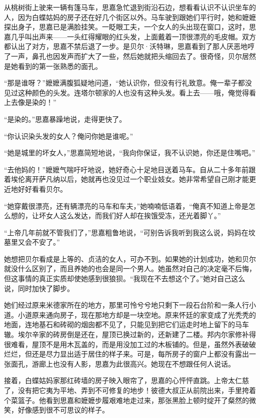\par 从桃树街上驶来一辆有篷马车，思嘉急忙退到街沿石边，想看看认识不认识坐车的人，因为白蝶姑妈的房子还在好几个街区以外。马车驶到跟她们平行时，她和嬷嬷探出身子，思嘉已是满脸挂笑。一眨眼工夫，一个女人的头出现在窗口，这时，思嘉几乎叫出声来——一头红得耀眼的红头发，上面戴着一顶很漂亮的毛皮帽。双方都认出了对方，思嘉不禁后退了一步。是贝尔·沃特琳，思嘉看到了那人厌恶地哼了一声，鼻孔也因发声而扩大了一些，然后她就把头缩回去了。很奇怪，贝尔居然是她看到的第一张熟悉的面孔。
\par “那是谁呀？”嬷嬷满腹狐疑地问道，“她认识你，但没有行礼致意。俺一辈子都没见过这种颜色的头发。连塔尔顿家的人也没有这种头发。看上去——哦，俺觉得看上去像是染的！”
\par “是染的。”思嘉暴躁地说，走得更快了。
\par “你认识染头发的女人？俺问你她是谁呢。”
\par “她是城里的坏女人，”思嘉简短地说，“我向你保证，我不认识她，你还是住嘴吧。”
\par “去他妈的！”嬷嬷气喘吁吁地说，她好奇心十足地目送着马车。自从二十多年前跟着埃伦离开萨凡纳以后，她就再也没见过一个职业妓女。她非常希望自己刚才能更近地好好看看贝尔。
\par “她穿戴很漂亮，还有辆漂亮的马车和车夫，”她喃喃低语着，“俺真不知道上帝是怎么想的，让坏女人这么发达，而我们好人却在挨饿受冻，还光着脚丫。”
\par “上帝几年前就不管我们了，”思嘉粗鲁地说，“可别告诉我听到我这么说，妈妈在坟墓里又会不安了。”
\par 她想把贝尔看成是上等的、贞洁的女人，可办不到。如果她的计划成功，她和贝尔就没什么区别了，而且养她的也会是同一个男人。她虽然对自己的决定毫不后悔，但这事情的真正实质却使她感到很狼狈。“我现在不去想这个了。”她对自己这么说，同时加快了脚步。
\par 她们经过原来米德家所在的地方，那里可怜兮兮地只剩下一段石台阶和一条人行小道。小道原来通向房子，现在那地方却是一块空地。原来怀廷的家变成了光秃秃的地面，连地基石和砖砌的烟囱都不见了，只能见到把它们运走时地上留下的马车辙。埃尔辛家的砖房倒是还在，屋顶已换过新的，还新建了二楼。邦内尔家修补得很难看，屋顶不是用木瓦盖的，而是用没加工过的木板铺的。但是，虽然外表破破烂烂，但还是尽力显出适于居住的样子来。可是，每所房子的窗户上都没有露出一张面孔，游廊上也没有人影，思嘉为此很高兴。她现在不想跟任何人说话。
\par 接着，白蝶姑妈家那红砖墙的房子映入眼帘了，思嘉的心怦怦直跳。上帝太仁慈了，没有把它夷为平地、弄到不可修复的地步！彼德大叔正从前院出来，手里挎着个菜篮子。他看到思嘉和嬷嬷步履艰难地走过来，那张黑脸上顿时绽开了粲然的微笑，好像感到很不可思议的样子。

